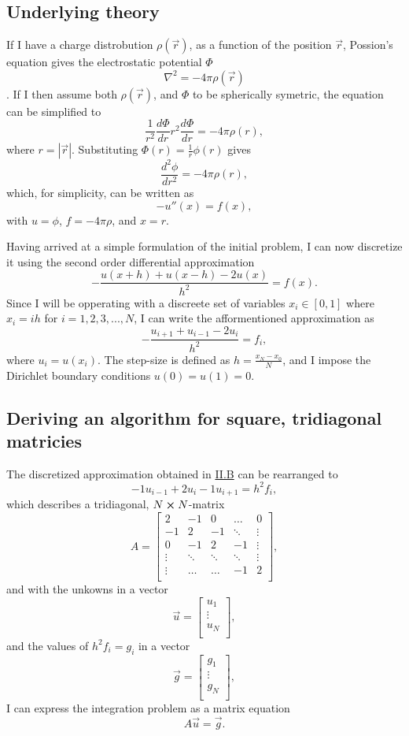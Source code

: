 \documentclass[english,notitlepage,reprint]{revtex4-1}  %
\begin{document}
\subsection{Underlying theory}\label{subsec:21}
If I have a charge distrobution \(\rho(\vec{r})\), as a function of the position \(\vec{r}\), Possion's equation gives the electrostatic potential \(\Phi\)
$$
	\nabla^{2}=-4\pi\rho(\vec{r})
$$
\citep{DepartmentofPhysics2019}. If I then assume both \(\rho(\vec{r})\), and \(\Phi\) to be spherically symetric, the equation can be simplified to
$$
	\frac{1}{r^{2}}\frac{d\Phi}{dr}r^{2}\frac{d\Phi}{dr}=-4\pi\rho(r),
$$
where \(r=|\vec{r}|\). Substituting \(\Phi(r)=\frac{1}{r}\phi(r)\) gives
$$
	\frac{d^{2}\phi}{dr^{2}}=-4\pi\rho(r),
$$
which, for simplicity, can be written as
$$
	-u''(x)=f(x),
$$
with \(u = \phi\), \(f=-4\pi\rho\), and \(x = r\)\citep{DepartmentofPhysics2019}.

Having arrived at a simple formulation of the initial problem, I can now discretize it using the second order differential approximation
$$
	-\frac{u(x+h)+u(x-h)-2u(x)}{h^{2}}=f(x).
$$
Since I will be opperating with a discreete set of variables \(x_{i}\in[0,1]\) where \(x_{i}=ih\) for \(i=1,2,3,...,N\), I can write the afformentioned approximation as
$$
	-\frac{u_{i+1}+u_{i-1}-2u_{i}}{h^{2}}=f_{i},
$$
where \(u_{i}=u(x_{i})\). The step-size is defined as \(h=\frac{x_{N}-x_{0}}{N}\), and I impose the Dirichlet boundary conditions \(u(0)=u(1)=0\)\citep{DepartmentofPhysics2019}.

\subsection{Deriving an algorithm for square, tridiagonal matricies}\label{subsec:22}

The discretized approximation obtained in \hyperref[subsec:21]{II.B} can be rearranged to
$$
	-1u_{i-1}+2u_{i}-1u_{i+1}=h^{2}f_{i},
$$
which describes a tridiagonal, \(N\cross N\)-matrix
$$
	A =
	\begin{bmatrix}
	2 & -1 & 0 & \dots & 0 \\
	-1 & 2 & -1 & \ddots &\vdots \\
	0 & -1 & 2 & -1 & \vdots \\
	\vdots & \ddots & \ddots & \ddots & \vdots \\
	\vdots & \dots & \dots & -1 & 2 \\
	\end{bmatrix},
$$
and with the unkowns in a vector
$$
	\vec{u} =
	\begin{bmatrix}
		u_{1} \\
		\vdots \\
		u_{N} \\
	\end{bmatrix},
$$
and the values of \(h^{2}f_{i} = g_{i}\) in a vector
$$
	\vec{g} =
	\begin{bmatrix}
		g_{1} \\
		\vdots \\
		g_{N} \\
	\end{bmatrix},
$$
I can express the integration problem as a matrix equation
$$
	A\vec{u}=\vec{g}.
$$
\end{document}

